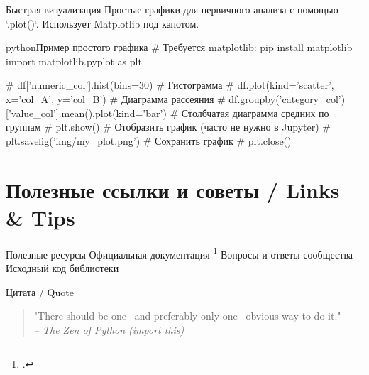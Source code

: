 \begin{textbox}{Быстрая визуализация}
Простые графики для первичного анализа с помощью `.plot()`. Использует Matplotlib под капотом.
\begin{codebox}{python}{Пример простого графика}
# Требуется matplotlib: pip install matplotlib
import matplotlib.pyplot as plt

# df['numeric_col'].hist(bins=30) # Гистограмма
# df.plot(kind='scatter', x='col_A', y='col_B') # Диаграмма рассеяния
# df.groupby('category_col')['value_col'].mean().plot(kind='bar') # Столбчатая диаграмма средних по группам
# plt.show() # Отобразить график (часто не нужно в Jupyter)
# plt.savefig('img/my_plot.png') # Сохранить график
# plt.close()
\end{codebox}
\end{textbox}

\section{Полезные ссылки и советы / Links \& Tips}
\begin{myblock}{Полезные ресурсы}
 {Официальная документация \footcite{pandas_documentation}}
 {Вопросы и ответы сообщества}
 {Исходный код библиотеки}
\end{myblock}

\begin{textbox}{Цитата / Quote}
\begin{quote}
"There should be one-- and preferably only one --obvious way to do it." \\ %
\emph{-- The Zen of Python (import this)}
\end{quote}
\end{textbox}

